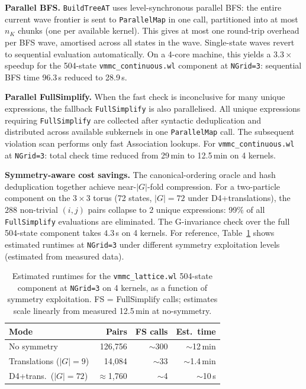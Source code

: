\documentclass[twocolumn,10pt]{article}
\begin{document}
\medskip\noindent\textbf{Parallel BFS.}
\texttt{BuildTreeAT} uses level-synchronous parallel BFS: the entire current
wave frontier is sent to \texttt{ParallelMap} in one call, partitioned into
at most $n_K$ chunks (one per available kernel).  This gives at most one
round-trip overhead per BFS wave, amortised across all states in the wave.
Single-state waves revert to sequential evaluation automatically.  On a
4-core machine, this yields a $3.3\times$ speedup for the 504-state
\texttt{vmmc\_continuous.wl} component at \texttt{NGrid=3}: sequential BFS
time 96.3\,s reduced to 28.9\,s.

\medskip\noindent\textbf{Parallel FullSimplify.}
When the fast check is inconclusive for many unique expressions, the fallback
\texttt{FullSimplify} is also parallelised.  All unique expressions requiring
\texttt{FullSimplify} are collected after syntactic deduplication and
distributed across available subkernels in one \texttt{ParallelMap} call.
The subsequent violation scan performs only fast Association lookups.  For
\texttt{vmmc\_continuous.wl} at \texttt{NGrid=3}: total check time reduced
from 29\,min to 12.5\,min on 4 kernels.

\medskip\noindent\textbf{Symmetry-aware cost savings.}
The canonical-ordering oracle and hash deduplication together achieve
near-$|G|$-fold compression.  For a two-particle component on the $3\times3$
torus (72 states, $|G|=72$ under D4+translations), the $288$ non-trivial
$(i,j)$ pairs collapse to $2$ unique expressions: 99\% of all \texttt{FullSimplify}
evaluations are eliminated.  The G-invariance check over the full 504-state
component takes $4.3$\,s on 4 kernels.  For reference, Table~\ref{tab:symtimes}
shows estimated runtimes at \texttt{NGrid=3} under different symmetry
exploitation levels (estimated from measured data).

\begin{table}[t]
  \centering
  \caption{Estimated runtimes for the \texttt{vmmc\_lattice.wl} 504-state
    component at \texttt{NGrid=3} on 4 kernels, as a function of symmetry
    exploitation.  FS = FullSimplify calls; estimates scale linearly from
    measured 12.5\,min at no-symmetry.}
  \label{tab:symtimes}
  \small
  \setlength{\tabcolsep}{3pt}
  \begin{tabular}{@{}lrrr@{}}
    \toprule
    Mode & Pairs & FS calls & Est.\ time \\
    \midrule
    No symmetry         & 126,756 & $\sim$300 & $\sim$12\,min \\
    Translations ($|G|=9$) & 14,084 & $\sim$33 & $\sim$1.4\,min \\
    D4+trans.\ ($|G|=72$) & $\approx$1,760 & $\sim$4 & $\sim$10\,s \\
    \bottomrule
  \end{tabular}
\end{table}
\end{document}
